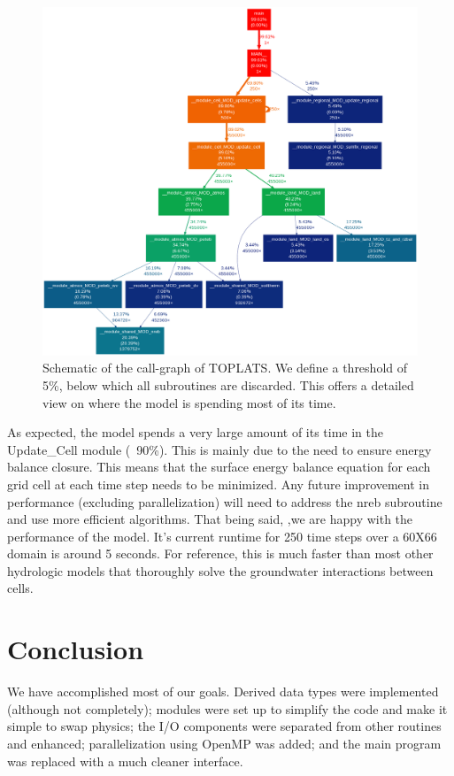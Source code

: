\documentclass[pdftex,12pt,a4paper]{article}
\begin{document}
\begin{figure}[h]
	\includegraphics[width=5.0in]{Figures/CallGraph.png}

	\caption{Schematic of the call-graph of TOPLATS. We define a threshold of 5\%, below which all subroutines are discarded. This offers a detailed view on where the model is spending most of its time.}
	\label{Profiling1}
\end{figure}

As expected, the model spends a very large amount of its time in the Update\_Cell module (~90\%). This is mainly due to the need to ensure energy balance closure. This means that the surface energy balance equation for each grid cell at each time step needs to be minimized. Any future improvement in performance (excluding parallelization) will need to address the nreb subroutine and use more efficient algorithms. That being said, ,we are happy with the performance of the model. It's current runtime for 250 time steps over a 60X66 domain is around 5 seconds. For reference, this is much faster than most other hydrologic models that thoroughly solve the groundwater interactions between cells.

\section{Conclusion}

We have accomplished most of our goals. Derived data types were implemented (although not completely); modules were set up to simplify the code and make it simple to swap physics; the I/O components were separated from other routines and enhanced; parallelization using OpenMP was added; and the main program was replaced with a much cleaner interface. 
\end{document}
